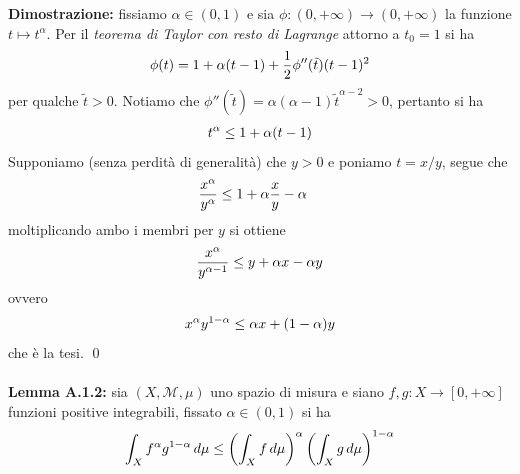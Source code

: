 \documentclass{article}
\numberwithin{equation}{subsection}
\begin{document}
\textbf{Dimostrazione:} fissiamo $\alpha \in (0, 1)$ e sia $\phi : (0, +\infty) \longrightarrow (0, +\infty)$ la funzione $t \mapsto t^\alpha$. Per il \textit{teorema di Taylor con resto di Lagrange} attorno a $t_0 = 1$ si ha
\begin{align*}
    \phi(t) = 1 + \alpha(t - 1) + \frac{1}{2}\phi''(\tilde{t})(t - 1)^2 \notag
\end{align*}
per qualche $\tilde{t} > 0$. Notiamo che $\phi''(\tilde{t}) = \alpha(\alpha - 1)\tilde{t}^{\alpha - 2} > 0$, pertanto si ha 
\begin{align*}
    t^\alpha \leq 1 + \alpha(t - 1) \notag
\end{align*}
Supponiamo (senza perdità di generalità) che $y > 0$ e poniamo $t = x/y$, segue che 
\begin{align*}
    \frac{x^\alpha}{y^\alpha} &\leq 1 + \alpha\frac{x}{y} - \alpha \notag
\end{align*}
moltiplicando ambo i membri per $y$ si ottiene 
\begin{align*}
    \frac{x^\alpha}{y^{\alpha - 1}} \leq y + \alpha x - \alpha y \notag
\end{align*}
ovvero 
\begin{align*}
    x^{\alpha}y^{1 - \alpha} \leq \alpha x + (1 - \alpha)y \notag
\end{align*}
che è la tesi. \qed \\ \\
\textbf{Lemma A.1.2:} sia $(X, \mathcal{M}, \mu)$ uno spazio di misura e siano $f, g : X \longrightarrow [0, +\infty]$ funzioni positive integrabili, fissato $\alpha \in (0, 1)$ si ha 
\begin{align*}
    \int_X f^\alpha g^{1 - \alpha} \, d\mu \leq \left(\int_X f \, d\mu\right)^\alpha\left(\int_X g \, d\mu\right)^{1 - \alpha} \notag
\end{align*} \\
\end{document}
